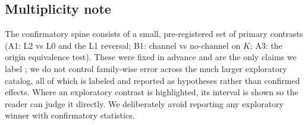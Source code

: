 \subsection{Multiplicity note}
\label{app:multiplicity}
The confirmatory spine consists of a small, pre-registered set of primary contrasts (A1: L2 vs
L0 and the L1 reversal; B1: channel vs no-channel on $K$; A3: the origin equivalence test). These
were fixed in advance and are the only claims we label \tC{}; we do not control family-wise error
across the much larger exploratory catalog, all of which is labeled \tE{} and reported as
hypotheses rather than confirmed effects. Where an exploratory contrast is highlighted, its
interval is shown so the reader can judge it directly. We deliberately avoid reporting any
exploratory winner with confirmatory statistics.
